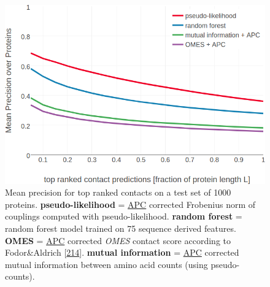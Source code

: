 \documentclass[11pt,a4paper,twoside]{book}
\theoremstyle{definition}
\theoremstyle{definition}
\theoremstyle{remark}
\begin{document}
\begin{figure}
\includegraphics[width=1\linewidth]{img/random_forest_contact_prior/precision_vs_rank_notitle} \caption{Mean precision for top ranked contacts on a
test set of 1000 proteins. \textbf{pseudo-likelihood} =
\protect\hyperlink{abbrev}{APC} corrected Frobenius norm of couplings
computed with pseudo-likelihood. \textbf{random forest} = random forest
model trained on 75 sequence derived features. \textbf{OMES} =
\protect\hyperlink{abbrev}{APC} corrected \emph{OMES} contact score
according to Fodor\&Aldrich
{[}\protect\hyperlink{ref-Fodor2004a}{214}{]}. \textbf{mutual
information} = \protect\hyperlink{abbrev}{APC} corrected mutual
information between amino acid counts (using pseudo-counts).}\label{fig:performance-rf}
\end{figure}
\end{document}
